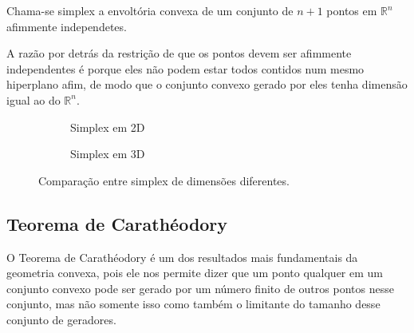 \begin{def:simplex}
	Chama-se simplex a envoltória convexa de um conjunto de $n+1$ pontos
	em $\mathbb{R}^n$ afimmente independetes.
\end{def:simplex}

A razão por detrás da restrição de que os pontos devem ser afimmente independentes
é porque eles não podem estar todos contidos num mesmo hiperplano afim, de modo
que o conjunto convexo gerado por eles tenha dimensão igual ao do $\mathbb{R}^n$.

\begin{figure}[h]
	\centering
	\begin{subfigure}{0.45\textwidth}
		\centering
		\caption{Simplex em 2D}
		\label{fig:triangulo}
	\end{subfigure}
	\hfill
	\begin{subfigure}{0.45\textwidth}
		\centering
		\caption{Simplex em 3D}
		\label{fig:tetraedro}
	\end{subfigure}
	\caption{Comparação entre simplex de dimensões diferentes.}
\end{figure}

\subsection{Teorema de Carathéodory}

O Teorema de Carathéodory é um dos resultados mais fundamentais da geometria
convexa, pois ele nos permite dizer que um ponto qualquer em um conjunto
convexo pode ser gerado por um número finito de outros pontos nesse conjunto,
mas não somente isso como também o limitante do tamanho desse conjunto de
geradores.

